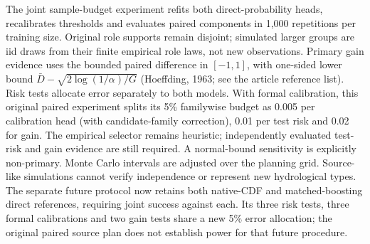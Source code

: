 The joint sample-budget experiment refits both direct-probability heads, recalibrates thresholds and evaluates paired components in 1,000 repetitions per training size. Original role supports remain disjoint; simulated larger groups are iid draws from their finite empirical role laws, not new observations. Primary gain evidence uses the bounded paired difference in $[-1,1]$, with one-sided lower bound $\bar D-\sqrt{2\log(1/\alpha)/G}$ (Hoeffding, 1963; see the article reference list). Risk tests allocate error separately to both models. With formal calibration, this original paired experiment splits its 5\% familywise budget as 0.005 per calibration head (with candidate-family correction), 0.01 per test risk and 0.02 for gain. The empirical selector remains heuristic; independently evaluated test-risk and gain evidence are still required. A normal-bound sensitivity is explicitly non-primary. Monte Carlo intervals are adjusted over the planning grid. Source-like simulations cannot verify independence or represent new hydrological types. The separate future protocol now retains both native-CDF and matched-boosting direct references, requiring joint success against each. Its three risk tests, three formal calibrations and two gain tests share a new 5\% error allocation; the original paired source plan does not establish power for that future procedure.

